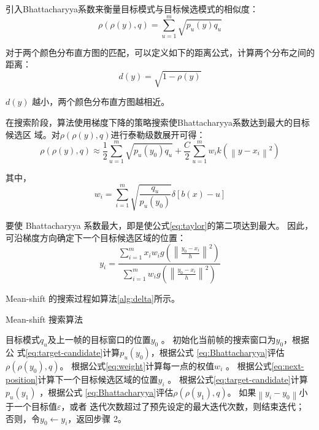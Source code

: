 引入Bhattacharyya系数来衡量目标模式与目标候选模式的相似度：
\begin{equation}
  \label{eq:Bhattacharyya}
  \rho(\rho(y),q)=\sum_{u=1}^{m}\sqrt{p_{u}(y)q_{u}}
\end{equation}

对于两个颜色分布直方图的匹配，可以定义如下的距离公式，计算两个分布之间的距离：
\begin{equation}
  \label{eq:distance}
  d(y)=\sqrt{1-\rho(y)}
\end{equation}

$d(y)$ 越小，两个颜色分布直方图越相近。

在搜索阶段，算法使用梯度下降的策略搜索使Bhattacharyya系数达到最大的目标候选区
域。对$\rho(\rho(y),q)$进行泰勒级数展开可得：
\begin{equation}
  \label{eq:taylor}
  \rho(\rho(y),q)\approx \frac{1}{2}\sum_{u=1}^{m}\sqrt{p_u(y_0)q_u}+\frac{C}{2}\sum_{u=1}^{m}w_{i}k(\left\|y-x_i\right\|^2)
\end{equation}

其中，
\begin{equation}
    \label{eq:weight}
    w_{i}=\sum_{i=1}^{m}\sqrt{\frac{q_u}{p_{u}(y_0)}}\delta[b(x)-u]
\end{equation}

要使 Bhattacharyya 系数最大，即是使公式\ref{eq:taylor}的第二项达到最大。
因此，可沿梯度方向确定下一个目标候选区域的位置：
\begin{equation}
    \label{eq:next-position}
    y_{i}=\frac{\sum_{i=1}^{m}x_{i}w_{i}g\left(\left\|\frac{y_0-x_i}{h}\right\|^{2}\right)}{\sum_{i=1}^{m}w_{i}g\left(\left\|\frac{y_0-x_i}{h}\right\|^{2}\right)}
  \end{equation}

Mean-shift 的搜索过程如算法\ref{alg:delta}所示。

\begin{algorithm}[htbp]
  \caption{Mean-shift 搜索算法}
  \label{alg:delta}
  \begin{algorithmic}[1]
    \REQUIRE 目标模式$q_u$及上一帧的目标窗口的位置$y_0$ 。
    \STATE 初始化当前帧的搜索窗口为$y_0$，根据公
    式\ref{eq:target-candidate}计算$p_u(y_0)$，根据公式
   \ref{eq:Bhattacharyya}评估$\rho(\rho(y_0),q)$。
    \STATE 根据公式\ref{eq:weight}计算每一点的权值$w_{i}$ 。
    \STATE 根据公式\ref{eq:next-position}计算下一个目标候选区域的位置$y_{i}$
   。
    \STATE 根据公式\ref{eq:target-candidate}计算$p_u(y_1)$ ，根据公式
   \ref{eq:Bhattacharyya}评估$\rho(\rho(y_1),q)$。
    \STATE 如果$\left\|y_{i}-y_{0}\right\|$小于一个目标值$\varepsilon$，或者
    迭代次数超过了预先设定的最大迭代次数，则结束迭代；\\
    否则，令$y_{0}\leftarrow y_{i}$，返回步骤 2。
  \end{algorithmic}
\end{algorithm}

